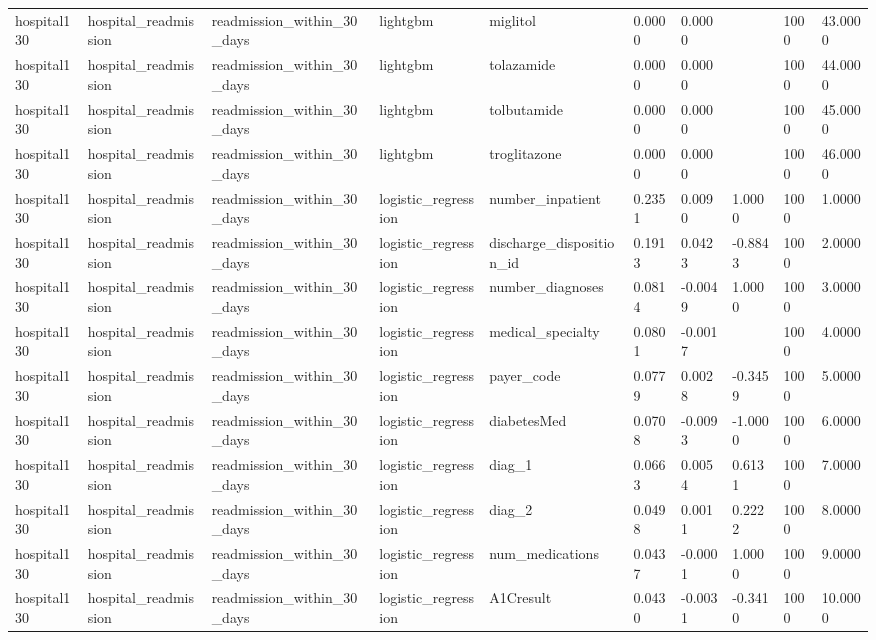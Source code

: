 \begin{tabular}{llllllllll}
hospital130 & hospital\_readmission & readmission\_within\_30\_days & lightgbm & miglitol & 0.0000 & 0.0000 &  & 1000 & 43.0000 \\
hospital130 & hospital\_readmission & readmission\_within\_30\_days & lightgbm & tolazamide & 0.0000 & 0.0000 &  & 1000 & 44.0000 \\
hospital130 & hospital\_readmission & readmission\_within\_30\_days & lightgbm & tolbutamide & 0.0000 & 0.0000 &  & 1000 & 45.0000 \\
hospital130 & hospital\_readmission & readmission\_within\_30\_days & lightgbm & troglitazone & 0.0000 & 0.0000 &  & 1000 & 46.0000 \\
hospital130 & hospital\_readmission & readmission\_within\_30\_days & logistic\_regression & number\_inpatient & 0.2351 & 0.0090 & 1.0000 & 1000 & 1.0000 \\
hospital130 & hospital\_readmission & readmission\_within\_30\_days & logistic\_regression & discharge\_disposition\_id & 0.1913 & 0.0423 & -0.8843 & 1000 & 2.0000 \\
hospital130 & hospital\_readmission & readmission\_within\_30\_days & logistic\_regression & number\_diagnoses & 0.0814 & -0.0049 & 1.0000 & 1000 & 3.0000 \\
hospital130 & hospital\_readmission & readmission\_within\_30\_days & logistic\_regression & medical\_specialty & 0.0801 & -0.0017 &  & 1000 & 4.0000 \\
hospital130 & hospital\_readmission & readmission\_within\_30\_days & logistic\_regression & payer\_code & 0.0779 & 0.0028 & -0.3459 & 1000 & 5.0000 \\
hospital130 & hospital\_readmission & readmission\_within\_30\_days & logistic\_regression & diabetesMed & 0.0708 & -0.0093 & -1.0000 & 1000 & 6.0000 \\
hospital130 & hospital\_readmission & readmission\_within\_30\_days & logistic\_regression & diag\_1 & 0.0663 & 0.0054 & 0.6131 & 1000 & 7.0000 \\
hospital130 & hospital\_readmission & readmission\_within\_30\_days & logistic\_regression & diag\_2 & 0.0498 & 0.0011 & 0.2222 & 1000 & 8.0000 \\
hospital130 & hospital\_readmission & readmission\_within\_30\_days & logistic\_regression & num\_medications & 0.0437 & -0.0001 & 1.0000 & 1000 & 9.0000 \\
hospital130 & hospital\_readmission & readmission\_within\_30\_days & logistic\_regression & A1Cresult & 0.0430 & -0.0031 & -0.3410 & 1000 & 10.0000 \\

\end{tabular}
